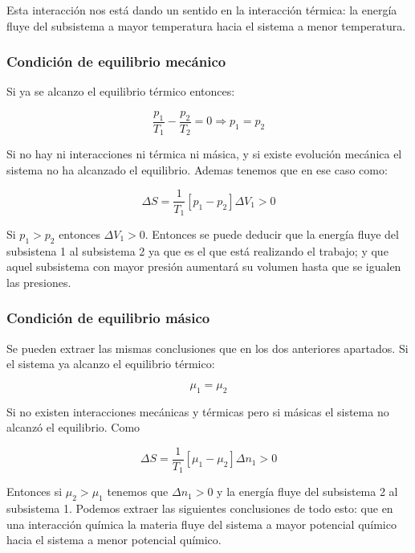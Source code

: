 \documentclass[12pt,a4paper]{article}
\begin{document}
Esta interacción nos está dando un sentido en la interacción térmica: la energía fluye del subsistema a mayor temperatura hacia el sistema a menor temperatura.


\subsubsection{Condición de equilibrio mecánico}

Si ya se alcanzo el equilibrio térmico entonces:

\begin{equation}
\dfrac{p_1}{T_1} - \dfrac{p_2}{T_2} = 0 \Longrightarrow p_1 = p_2
\end{equation}

Si no hay ni interacciones ni térmica ni másica, y si existe evolución mecánica el sistema no ha alcanzado el equilibrio. Ademas tenemos que en ese caso como:

\begin{equation}
\Delta S = \dfrac{1}{T_1} [p_1 - p_2] \Delta V_1 > 0
\end{equation}

Si $p_1 > p_2$ entonces $\Delta V_1 >0$. Entonces se puede deducir que la energía fluye del subsistena 1 al subsistema 2 ya que es el que está realizando el trabajo; y que aquel subsistema con mayor presión aumentará su volumen hasta que se igualen las presiones.

\subsubsection{Condición de equilibrio másico}

Se pueden extraer las mismas conclusiones que en los dos anteriores apartados. Si el sistema ya alcanzo el equilibrio térmico:

\begin{equation}
\mu_1 = \mu_2
\end{equation}

Si no existen interacciones mecánicas y térmicas pero si másicas el sistema no alcanzó el equilibrio. Como 


\begin{equation}
\Delta S = \dfrac{1}{T_1} [\mu_1 - \mu_2] \Delta n_1 > 0
\end{equation}

Entonces si $\mu_2 >  \mu_1$ tenemos que $\Delta n_1 > 0$ y la energía fluye del subsistema 2 al subsistema 1. Podemos extraer las siguientes conclusiones de todo esto: que en una interacción química la materia fluye del sistema a mayor potencial químico hacia el sistema a menor potencial químico.
\end{document}
